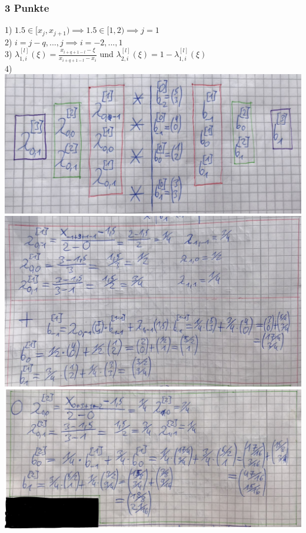 \subsubsection{3 Punkte}

1) $1.5 \in [x_{j}, x_{j+1}) \implies 1.5 \in [1,2) \implies j=1$
\\
2) $i = j - q,...,j \implies i = -2,...,1$
\\
3) $\lambda_{1,i}^{[l]}(\xi) = \frac{x_{i+q+1-l}- \xi}{x_{i+q+1-l}-x_i}$
und $\lambda_{2,i}^{[l]}(\xi) = 1 - \lambda_{1,i}^{[l]}(\xi)$
\\
4)
\includegraphics[scale=0.5]{1b)1.PNG}
\\
\includegraphics[scale=0.5]{1b)2.PNG}
\\
\includegraphics[scale=0.5]{1b)3.PNG}
